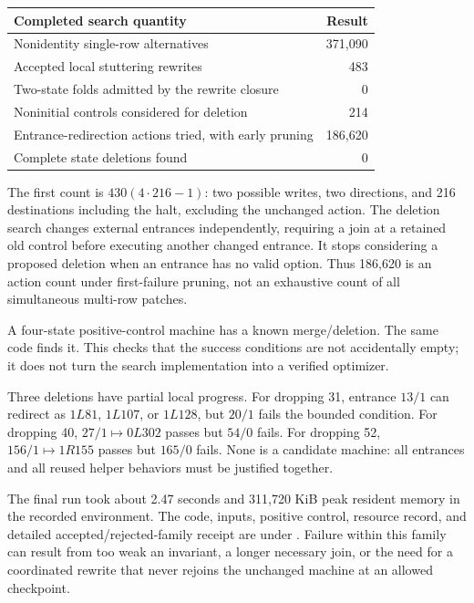 \documentclass[11pt]{article}
\newcommand{\artifact}[1]{\path{#1}}
\begin{document}
\begin{center}
\begin{tabular}{@{}lr@{}}
\toprule
Completed search quantity & Result \\
\midrule
Nonidentity single-row alternatives & 371,090 \\
Accepted local stuttering rewrites & 483 \\
Two-state folds admitted by the rewrite closure & 0 \\
Noninitial controls considered for deletion & 214 \\
Entrance-redirection actions tried, with early pruning & 186,620 \\
Complete state deletions found & 0 \\
\bottomrule
\end{tabular}
\end{center}

The first count is $430(4\cdot216-1)$: two possible writes, two directions, and 216 destinations including the halt, excluding the unchanged action. The deletion search changes external entrances independently, requiring a join at a retained old control before executing another changed entrance. It stops considering a proposed deletion when an entrance has no valid option. Thus 186,620 is an action count under first-failure pruning, not an exhaustive count of all simultaneous multi-row patches.

A four-state positive-control machine has a known merge/deletion. The same code finds it. This checks that the success conditions are not accidentally empty; it does not turn the search implementation into a verified optimizer.

Three deletions have partial local progress. For dropping 31, entrance $13/1$ can redirect as $1L81$, $1L107$, or $1L128$, but $20/1$ fails the bounded condition. For dropping 40, $27/1\mapsto0L302$ passes but $54/0$ fails. For dropping 52, $156/1\mapsto1R155$ passes but $165/0$ fails. None is a candidate machine: all entrances and all reused helper behaviors must be justified together.

The final run took about 2.47 seconds and 311,720 KiB peak resident memory in the recorded environment. The code, inputs, positive control, resource record, and detailed accepted/rejected-family receipt are under \artifact{reductions/}. Failure within this family can result from too weak an invariant, a longer necessary join, or the need for a coordinated rewrite that never rejoins the unchanged machine at an allowed checkpoint.
\end{document}
